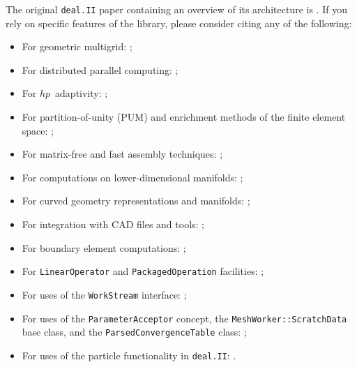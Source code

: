 \documentclass{ansarticle-preprint}
\newcommand{\specialword}[1]{\texttt{#1}}
\newcommand{\dealii}{{\specialword{deal.II}}\xspace}
\begin{document}
The original \dealii{} paper containing an overview of its
architecture is \cite{BangerthHartmannKanschat2007}. If you rely on
specific features of the library, please consider citing any of the
following:
\begin{multicols}{2}
  \vspace*{-36pt}
  \begin{itemize}
    \item For geometric multigrid: \cite{Kanschat2004,JanssenKanschat2011,ClevengerHeisterKanschatKronbichler2019};
    \item For distributed parallel computing: \cite{BangerthBursteddeHeisterKronbichler11};
    \item For $hp$~adaptivity: \cite{BangerthKayserHerold2007};
    \item For partition-of-unity (PUM) and enrichment methods of the
          finite element space: \cite{Davydov2016};
    \item For matrix-free and fast assembly techniques:
          \cite{KronbichlerKormann2012,KronbichlerKormann2019};
    \item For computations on lower-dimensional manifolds:
          \cite{DeSimoneHeltaiManigrasso2009};
    \item For curved geometry representations and manifolds:
          \cite{HeltaiBangerthKronbichlerMola2019};
          \vfill\null  \columnbreak
    \item For integration with CAD files and tools:
          \cite{HeltaiMola2015};
    \item For boundary element computations:
          \cite{GiulianiMolaHeltai-2018-a};
    \item For \texttt{LinearOperator} and \texttt{PackagedOperation} facilities:
          \cite{MaierBardelloniHeltai-2016-a,MaierBardelloniHeltai-2016-b};
    \item For uses of the \texttt{WorkStream} interface:
          \cite{TKB16};
    \item For uses of the \texttt{ParameterAcceptor} concept, the
          \texttt{MeshWorker::ScratchData} base class, and the
          \texttt{ParsedConvergenceTable} class:
          \cite{SartoriGiulianiBardelloni-2018-a};
    \item For uses of the particle functionality in \dealii{}:
          \cite{GLHPB18}.
          \vfill\null
  \end{itemize}
\end{multicols}
\end{document}
